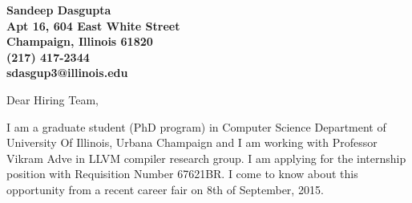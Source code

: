 \documentclass[11pt]{letter} %
\newcommand{\cmt}[1]{}
\begin{document}

\begin{letter}{
  \cmt{
  Jane Smith \\
Recruitment Officer \\
The Corporation \\
123 Pleasant Lane \\
City, State 12345
  }
} 


\begin{center}
\large\bf Sandeep Dasgupta \\ %
Apt 16, 604 East White Street \\ Champaign, Illinois 61820 \\ (217) 417-2344  \\ sdasgup3@illinois.edu%
\end{center} 
\vfill

\signature{Sandeep Dasgupta} %


\opening{Dear Hiring Team,} 
 
I am a graduate student (PhD program) in Computer Science Department of
University Of Illinois, Urbana Champaign and I am working with Professor Vikram
Adve in LLVM compiler research group.  I am applying for the internship position
with Requisition Number 67621BR.  I come to know about this opportunity from a
recent career fair on 8th of September, 2015.


\end{letter}
\end{document}
